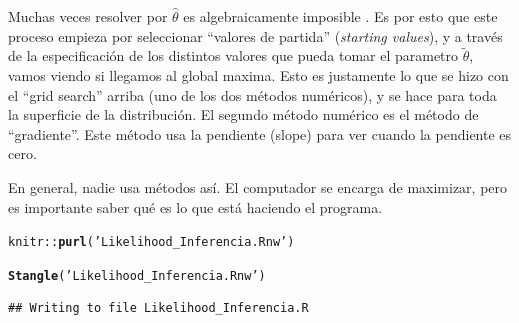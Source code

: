 \documentclass[onesided]{article}\usepackage[]{graphicx}\usepackage[]{color}
\makeatletter
\newcommand{\hlstr}[1]{\textcolor[rgb]{0.192,0.494,0.8}{#1}}%
\newcommand{\hlopt}[1]{\textcolor[rgb]{0,0,0}{#1}}%
\newcommand{\hlstd}[1]{\textcolor[rgb]{0.345,0.345,0.345}{#1}}%
\newcommand{\hlkwd}[1]{\textcolor[rgb]{0.737,0.353,0.396}{\textbf{#1}}}%
\newenvironment{kframe}{%
 \def\at@end@of@kframe{}%
 \ifinner\ifhmode%
  \def\at@end@of@kframe{\end{minipage}}%
  \begin{minipage}{\columnwidth}%
 \fi\fi%
 \def\FrameCommand##1{\hskip\@totalleftmargin \hskip-\fboxsep
 \colorbox{shadecolor}{##1}\hskip-\fboxsep
     \hskip-\linewidth \hskip-\@totalleftmargin \hskip\columnwidth}%
 \MakeFramed {\advance\hsize-\width
   \@totalleftmargin\z@ \linewidth\hsize
   \@setminipage}}%
 {\par\unskip\endMakeFramed%
 \at@end@of@kframe}
\newenvironment{knitrout}{}{} %
\makeatother
\begin{document}
Muchas veces resolver por $\hat\theta$ es algebraicamente imposible \parencite[72]{King1998}. Es por esto que este proceso empieza por seleccionar ``valores de partida'' (\emph{starting values}), y a trav\'es de la especificaci\'on de los distintos valores que pueda tomar el parametro $\tilde{\theta}$, vamos viendo si llegamos al global maxima. Esto es justamente lo que se hizo con el ``grid search'' arriba (uno de los dos m\'etodos num\'ericos), y se hace para toda la superficie de la distribuci\'on. El segundo m\'etodo num\'erico es el m\'etodo de ``gradiente''. Este m\'etodo usa la pendiente (slope) para ver cuando la pendiente es cero. 


En general, nadie usa m\'etodos as\'i. El computador se encarga de maximizar, pero es importante saber qu\'e es lo que est\'a haciendo el programa.


\begin{knitrout}
\color{fgcolor}\begin{kframe}
\begin{alltt}
\hlstd{knitr}\hlopt{::}\hlkwd{purl}\hlstd{(}\hlstr{'Likelihood_Inferencia.Rnw'}\hlstd{)}
\end{alltt}


{\ttfamily\noindent\bfseries{}}\begin{alltt}
\hlkwd{Stangle}\hlstd{(}\hlstr{'Likelihood_Inferencia.Rnw'}\hlstd{)}
\end{alltt}
\begin{verbatim}
## Writing to file Likelihood_Inferencia.R
\end{verbatim}
\end{kframe}
\end{knitrout}

\paragraph{}
\paragraph{}
\setcounter{page}{1}
\printbibliography
\end{document}
